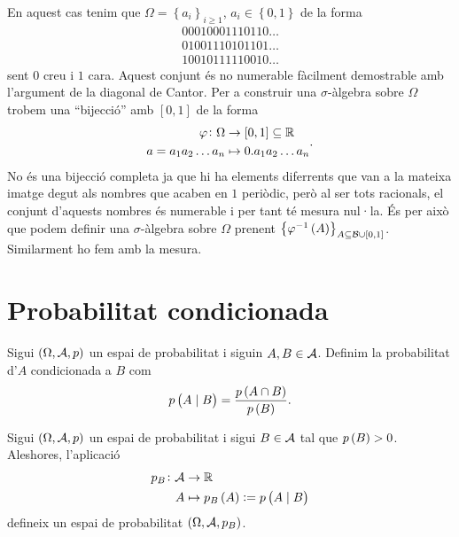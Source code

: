 \begin{example}
\begin{enumerate}
     En aquest cas tenim que $\Omega = \left\{a_i\right\}_{i\geq1}$, $a_i \in \left\{0,1\right\}$ de la forma
     \begin{gather*}
	00010001110110\dots \\
	01001110101101\dots \\
	10010111110010\dots 
     \end{gather*}
      sent $0$ creu i $1$ cara. Aquest conjunt és no numerable fàcilment demostrable amb l'argument de la diagonal de Cantor.
      Per a construir una $\sigma$-àlgebra sobre $\Omega$ trobem una ``bijecció'' amb $\left[0,1\right]$ de la forma
      \[
        \begin{aligned}
            \varphi\colon\Omega &\to [0,1]\subseteq\mathbb{R} \\
            a=a_1a_2\dots a_n &\mapsto 0.a_1a_2\dots a_n
        \end{aligned}.
      \]
      No és una bijecció completa ja que hi ha elements diferrents que van a la mateixa imatge degut als nombres que acaben en $1$ periòdic, però al ser tots racionals,
      el conjunt d'aquests nombres és numerable i per tant té mesura nul·la. És per això que podem definir una $\sigma$-àlgebra sobre $\Omega$ prenent 
      $\left\{\varphi^{-1}\left( A\right) \right\}_{A\subseteq \mathcal{B}\cup[0,1]}$. Similarment ho fem amb la mesura.
    \end{enumerate}
\end{example}


\section{Probabilitat condicionada}
\begin{defi}
    Sigui $\left( \Omega, \mathcal{A}, p\right)$ un espai de probabilitat i siguin $A, B \in \mathcal{A}$. Definim la probabilitat d'$A$ condicionada a $B$ com
    \[
        p\left( A\mid B\right) = \frac{p\left( A\cap B\right)}{p\left( B\right)}.
    \]
\end{defi}
\begin{obs}
    Sigui $\left( \Omega, \mathcal{A}, p\right)$ un espai de probabilitat i sigui $B \in \mathcal{A}$ tal que $p\left( B\right) > 0$. Aleshores, l'aplicació
    \begin{align*}
        p_B\colon \mathcal{A} &\to \mathbb{R} \\
        A &\mapsto p_B\left( A\right) := p\left( A\mid B\right)
    \end{align*}
    defineix un espai de probabilitat $\left( \Omega, \mathcal{A}, p_B\right)$.
\end{obs}

